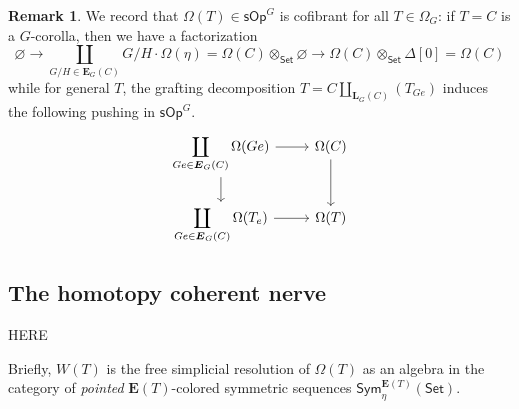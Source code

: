 \documentclass[a4paper,10pt
,draft
]{article}%
\numberwithin{equation}{section}
\numberwithin{figure}{section}
\theoremstyle{definition} %
\newtheorem{remark}[equation]{Remark}%
\newcommand{\longto}{\longrightarrow}%
\newcommand{\Sym}{\ensuremath{\mathsf{Sym}}}%
\newcommand{\Set}{\ensuremath{\mathsf{Set}}}
\newcommand{\sOp}{\ensuremath{\mathsf{sOp}}}%
\newcommand{\1}{\ensuremath{\mathbbm 1}}%
\begin{document}
\begin{remark}
      We record that $\Omega(T) \in \sOp^G$ is cofibrant for all $T \in \Omega_G$:
      if $T = C$ is a $G$-corolla, then we have a factorization
      \[
            \varnothing \longto
            \coprod_{G/H \in \boldsymbol{E}_G(C)} G/H \cdot \Omega(\eta) = \Omega(C) \otimes_\Set \varnothing \longto
            \Omega(C) \otimes_\Set \Delta[0] = \Omega(C)
      \]
      while for general $T$, the grafting decomposition $T = C \amalg_{\boldsymbol{L}_G(C)}(T_{Ge})$ induces the following pushing in $\sOp^G$.
      \[
            \begin{tikzcd}
                  \displaystyle{
                    \coprod_{Ge \in \boldsymbol{E}_G(C)} \Omega(Ge)}
                  \arrow[r] \arrow[d]
                  &
                  \Omega(C) \arrow[d]
                  \\
                  \displaystyle{
                    \coprod_{Ge \in \boldsymbol{E}_G(C)} \Omega(T_e)}
                  \arrow[r]
                  &
		\Omega(T)
          \end{tikzcd}
    \]
\end{remark}










\subsection{The homotopy coherent nerve}

{\color{red} HERE}


Briefly, $W(T)$ is the free simplicial resolution %
of $\Omega(T)$ as an algebra in the category of \textit{pointed} $\mathbf E(T)$-colored symmetric sequences $\Sym^{\mathbf E(T)}_{\eta}(\Set)$.
\end{document}
